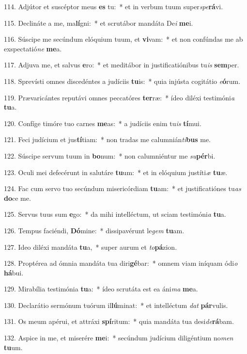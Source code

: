 114. Adjútor et suscéptor meus \textbf{es} tu:~*  et in verbum tuum super\textit{spe}\textbf{rá}vi.\

115. Declináte a me, ma\textbf{lí}gni:~*  et scrutábor mandáta De\textit{i} \textbf{me}i.\

116. Súscipe me secúndum elóquium tuum, et \textbf{vi}vam:~*  et non confúndas me ab exspectatió\textit{ne} \textbf{me}a.\

117. Adjuva me, et salvus \textbf{e}ro:~*  et meditábor in justificatiónibus tu\textit{is} \textbf{sem}per.\

118. Sprevísti omnes discedéntes a judíciis \textbf{tu}is:~*  quia injústa cogitátio \textit{e}\textbf{ó}rum.\

119. Prævaricántes reputávi omnes peccatóres \textbf{ter}ræ:~*  ídeo diléxi testimóni\textit{a} \textbf{tu}a.\

120. Confíge timóre tuo carnes \textbf{me}as:~*  a judíciis enim tu\textit{is} \textbf{tí}mui.\

121. Feci judícium et jus\textbf{tí}tiam:~*  non tradas me calumnián\textit{ti}\textbf{bus} me.\

122. Súscipe servum tuum in \textbf{bo}num:~*  non calumniéntur me \textit{su}\textbf{pér}bi.\

123. Oculi mei defecérunt in salutáre \textbf{tu}um:~*  et in elóquium justíti\textit{æ} \textbf{tu}æ.\

124. Fac cum servo tuo secúndum misericórdiam \textbf{tu}am:~*  et justificatiónes tu\textit{as} \textbf{do}ce me.\

125. Servus tuus sum \textbf{e}go:~*  da mihi intelléctum, ut sciam testimóni\textit{a} \textbf{tu}a.\

126. Tempus faciéndi, \textbf{Dó}mine:~*  dissipavérunt le\textit{gem} \textbf{tu}am.\

127. Ideo diléxi mandáta \textbf{tu}a,~*  super aurum et \textit{to}\textbf{pá}zion.\

128. Proptérea ad ómnia mandáta tua diri\textbf{gé}bar:~*  omnem viam iníquam ódi\textit{o} \textbf{há}bui.\

129. Mirabília testimónia \textbf{tu}a:~*  ídeo scrutáta est ea áni\textit{ma} \textbf{me}a.\

130. Declarátio sermónum tuórum il\textbf{lú}minat:~*  et intelléctum \textit{dat} \textbf{pár}vulis.\

131. Os meum apérui, et attráxi \textbf{spí}ritum:~*  quia mandáta tua desi\textit{de}\textbf{rá}bam.\

132. Aspice in me, et miserére \textbf{me}i:~*  secúndum judícium diligéntium no\textit{men} \textbf{tu}um.\


